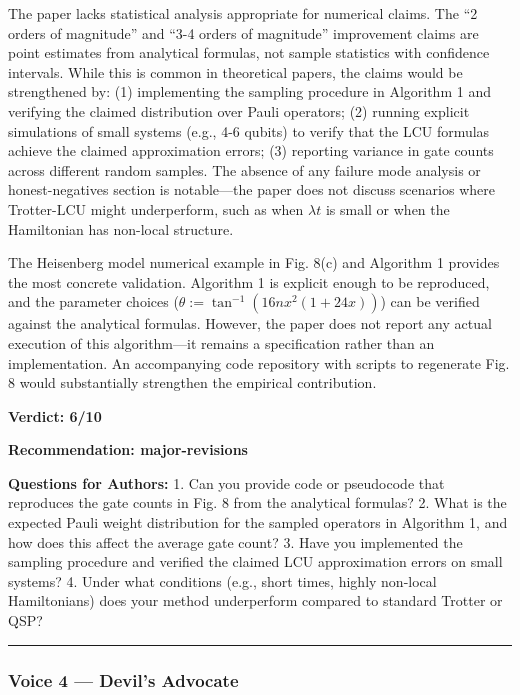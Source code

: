 \documentclass[10pt,letterpaper]{article}
\begin{document}
The paper lacks statistical analysis appropriate for numerical claims. The ``2 orders of magnitude'' and ``3-4 orders of magnitude'' improvement claims are point estimates from analytical formulas, not sample statistics with confidence intervals. While this is common in theoretical papers, the claims would be strengthened by: (1) implementing the sampling procedure in Algorithm 1 and verifying the claimed distribution over Pauli operators; (2) running explicit simulations of small systems (e.g., 4-6 qubits) to verify that the LCU formulas achieve the claimed approximation errors; (3) reporting variance in gate counts across different random samples. The absence of any failure mode analysis or honest-negatives section is notable---the paper does not discuss scenarios where Trotter-LCU might underperform, such as when \(\lambda t\) is small or when the Hamiltonian has non-local structure.

The Heisenberg model numerical example in Fig. 8(c) and Algorithm 1 provides the most concrete validation. Algorithm 1 is explicit enough to be reproduced, and the parameter choices (\(\theta := \tan^{-1}(16nx^2(1+24x))\)) can be verified against the analytical formulas. However, the paper does not report any actual execution of this algorithm---it remains a specification rather than an implementation. An accompanying code repository with scripts to regenerate Fig. 8 would substantially strengthen the empirical contribution.

\textbf{Verdict: 6/10}

\textbf{Recommendation: major-revisions}

\textbf{Questions for Authors:}
1. Can you provide code or pseudocode that reproduces the gate counts in Fig. 8 from the analytical formulas?
2. What is the expected Pauli weight distribution for the sampled operators in Algorithm 1, and how does this affect the average gate count?
3. Have you implemented the sampling procedure and verified the claimed LCU approximation errors on small systems?
4. Under what conditions (e.g., short times, highly non-local Hamiltonians) does your method underperform compared to standard Trotter or QSP?

\begin{center}\rule{0.5\linewidth}{0.5pt}\end{center}

\hypertarget{voice-4-devils-advocate}{%
\subsubsection{Voice 4 --- Devil's Advocate}\label{voice-4-devils-advocate}}
\end{document}
